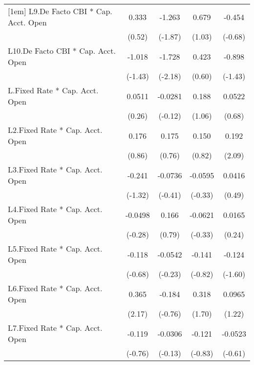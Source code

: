 {\begin{longtable}{l*{4}{c}}
[1em]
L9.De Facto CBI * Cap. Acct. Open&    0.333         &   -1.263         &    0.679         &   -0.454         \\
                &   (0.52)         &  (-1.87)         &   (1.03)         &  (-0.68)         \\
[1em]
L10.De Facto CBI * Cap. Acct. Open&   -1.018         &   -1.728\sym{*}  &    0.423         &   -0.898         \\
                &  (-1.43)         &  (-2.18)         &   (0.60)         &  (-1.43)         \\
[1em]
L.Fixed Rate * Cap. Acct. Open&   0.0511         &  -0.0281         &    0.188         &   0.0522         \\
                &   (0.26)         &  (-0.12)         &   (1.06)         &   (0.68)         \\
[1em]
L2.Fixed Rate * Cap. Acct. Open&    0.176         &    0.175         &    0.150         &    0.192\sym{*}  \\
                &   (0.86)         &   (0.76)         &   (0.82)         &   (2.09)         \\
[1em]
L3.Fixed Rate * Cap. Acct. Open&   -0.241         &  -0.0736         &  -0.0595         &   0.0416         \\
                &  (-1.32)         &  (-0.41)         &  (-0.33)         &   (0.49)         \\
[1em]
L4.Fixed Rate * Cap. Acct. Open&  -0.0498         &    0.166         &  -0.0621         &   0.0165         \\
                &  (-0.28)         &   (0.79)         &  (-0.33)         &   (0.24)         \\
[1em]
L5.Fixed Rate * Cap. Acct. Open&   -0.118         &  -0.0542         &   -0.141         &   -0.124         \\
                &  (-0.68)         &  (-0.23)         &  (-0.82)         &  (-1.60)         \\
[1em]
L6.Fixed Rate * Cap. Acct. Open&    0.365\sym{*}  &   -0.184         &    0.318         &   0.0965         \\
                &   (2.17)         &  (-0.76)         &   (1.70)         &   (1.22)         \\
[1em]
L7.Fixed Rate * Cap. Acct. Open&   -0.119         &  -0.0306         &   -0.121         &  -0.0523         \\
                &  (-0.76)         &  (-0.13)         &  (-0.83)         &  (-0.61)         \\

\end{longtable}}
